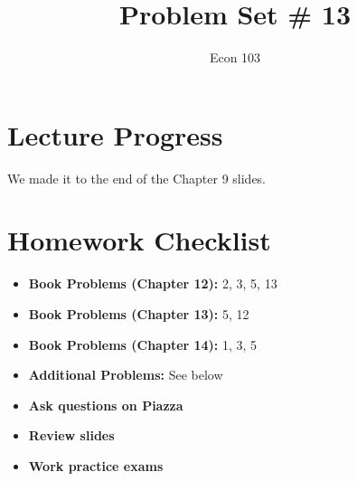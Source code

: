 \documentclass[addpoints,12pt]{exam}\usepackage[]{graphicx}\usepackage[]{color}
\title{Problem Set \# 13}
\author{Econ 103}
\date{}
\begin{document}
  \maketitle
  
  \section*{Lecture Progress}
  We made it to the end of the Chapter 9 slides.
  
  \section*{Homework Checklist}
  \begin{itemize}[label = $\square$]
  \item \textbf{Book Problems (Chapter 12):} 2, 3, 5, 13
  \item \textbf{Book Problems (Chapter 13):} 5, 12
  \item \textbf{Book Problems (Chapter 14):} 1, 3, 5
  \item \textbf{Additional Problems: }See below
  \item \textbf{Ask questions on Piazza}
  \item \textbf{Review slides}
  \item \textbf{Work practice exams}
  \end{itemize}
  
\end{document}
